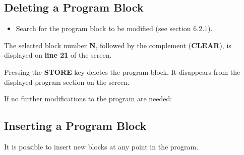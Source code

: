 \newpage

\subsection{Deleting a Program Block}

\begin{itemize}
    \item Search for the program block to be modified (see section 6.2.1).
\end{itemize}

\begin{itemize}
\end{itemize}

\vspace{.5cm}

\begin{itemize}
\end{itemize}

\vspace{.5cm}

The selected block number \textbf{N}, followed by the complement (\textbf{CLEAR}), is displayed on \textbf{line 21} of the screen.

\begin{itemize}
\end{itemize}

\vspace{.5cm}

Pressing the \textbf{STORE} key deletes the program block.  
It disappears from the displayed program section on the screen.

If no further modifications to the program are needed:

\begin{itemize}
\end{itemize}

\vspace{.5cm}

\subsection{Inserting a Program Block}

It is possible to insert new blocks at any point in the program.

